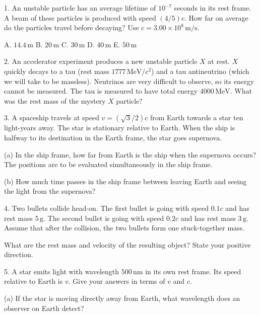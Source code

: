 \documentclass[12pt,letterpaper]{article}
\begin{document}
1. An unstable particle has an average lifetime of $10^{-7}$ seconds in its rest frame. A beam of these particles is produced with speed $(4/5)c$. How far on average do the particles travel before decaying? Use $c=3.00\times10^8\,\mathrm{m/s}$.

A. $14.4\,\mathrm{m}$ \qquad
B. $20\,\mathrm{m}$ \qquad
C. $30\,\mathrm{m}$ \qquad
D. $40\,\mathrm{m}$ \qquad
E. $50\,\mathrm{m}$

\vfill
\newpage

2. An accelerator experiment produces a new unstable particle $X$ at rest. $X$ quickly decays to a tau (rest mass $1777\,\mathrm{MeV}/c^2$) and a tau antineutrino (which we will take to be massless). Neutrinos are very difficult to observe, so its energy cannot be measured. The tau is measured to have total energy $4000\,\mathrm{MeV}$. What was the rest mass of the mystery $X$ particle?

\vfill
\newpage

3. A spaceship travels at speed $v=(\sqrt{3}/2)c$ from Earth towards a star ten light-years away. The star is stationary relative to Earth. When the ship is halfway to its destination in the Earth frame, the star goes supernova.

(a) In the ship frame, how far from Earth is the ship when the supernova occurs? The positions are to be evaluated simultaneously in the ship frame.

\vfill

(b) How much time passes in the ship frame between leaving Earth and seeing the light from the supernova?

\vfill
\newpage

4. Two bullets collide head-on. The first bullet is going with speed $0.1c$ and has rest mass $5\,\mathrm{g}$. The second bullet is going with speed $0.2c$ and has rest mass $3\,\mathrm{g}$. Assume that after the collision, the two bullets form one stuck-together mass.

What are the rest mass and velocity of the resulting object? State your positive direction.

\vfill
\newpage

5. A star emits light with wavelength $500\,\mathrm{nm}$ in its own rest frame. Its speed relative to Earth is $v$. Give your answers in terms of $v$ and $c$.

(a) If the star is moving directly away from Earth, what wavelength does an observer on Earth detect?

\vfill
\end{document}
